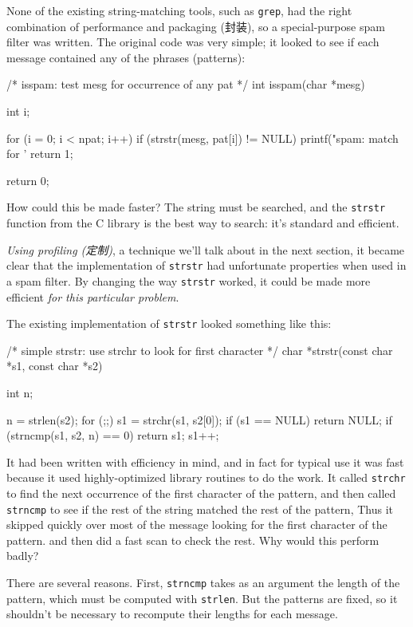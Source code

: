 None of the existing string-matching tools, such as \verb'grep', had the
right combination of performance and packaging (封装), so a special-purpose
spam filter was written. The original code was very simple; it looked to
see if each message contained any of the phrases (patterns):
\begin{wellcode}
    /* isspam: test mesg for occurrence of any pat */
    int isspam(char *mesg)
    {
        int i;

        for (i = 0; i < npat; i++)
            if (strstr(mesg, pat[i]) != NULL) {
                printf("spam: match for '%
                return 1;
            }

        return 0;
    }
\end{wellcode}
How could this be made faster? The string must be searched, and the
\verb'strstr' function from the C library is the best way to search: it's
standard and efficient.

\emph{Using profiling (定制)}, a technique we'll talk about in the next
section, it became clear that the implementation of \verb'strstr' had
unfortunate properties when used in a spam filter. By changing the way
\verb'strstr' worked, it could be made more efficient \emph{for this
    particular problem}.

The existing implementation of \verb'strstr' looked something like this:
\begin{wellcode}
    /* simple strstr: use strchr to look for first character */
    char *strstr(const char *s1, const char *s2)
    {
        int n;

        n = strlen(s2);
        for (;;) {
            s1 = strchr(s1, s2[0]);
            if (s1 == NULL)
                return NULL;
            if (strncmp(s1, s2, n) == 0)
                return s1;
            s1++;
        }
    }
\end{wellcode}
It had been written with efficiency in mind, and in fact for typical use it
was fast because it used highly-optimized library routines to do the work.
It called \verb'strchr' to find the next occurrence of the first character
of the pattern, and then called \verb'strncmp' to see if the rest of the
string matched the rest of the pattern, Thus it skipped quickly over most
of the message looking for the first character of the pattern.  and then
did a fast scan to check the rest. Why would this perform badly?

There are several reasons. First, \verb'strncmp'
takes as an argument the length
of the pattern, which must be computed with \verb'strlen'. But the patterns
are fixed, so it shouldn't be necessary to recompute their lengths for each
message.

